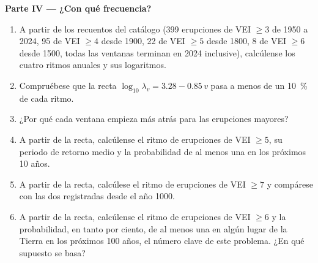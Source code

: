 \begin{problem}
\noindent\textbf{Parte IV --- ¿Con qué frecuencia?}
\begin{enumerate}[resume]
\item A partir de los recuentos del catálogo (399 erupciones de VEI $\ge 3$ de 1950 a
2024, 95 de VEI $\ge 4$ desde 1900, 22 de VEI $\ge 5$ desde 1800, 8 de VEI $\ge 6$ desde
1500, todas las ventanas terminan en 2024 inclusive), calcúlense los cuatro ritmos anuales y
sus logaritmos.
\item Compruébese que la recta $\log_{10}\lambda_v = 3.28 - 0.85\,v$ pasa a menos de un
\qty{10}{\percent} de cada ritmo.
\item ¿Por qué cada ventana empieza más atrás para las erupciones mayores?
\item A partir de la recta, calcúlense el ritmo de erupciones de VEI $\ge 5$, su periodo
de retorno medio y la probabilidad de al menos una en los próximos 10 años.
\item A partir de la recta, calcúlese el ritmo de erupciones de VEI $\ge 7$ y compárese
con las dos registradas desde el año 1000.
\item A partir de la recta, calcúlense el ritmo de erupciones de VEI $\ge 6$ y la
probabilidad, en tanto por ciento, de al menos una en algún lugar de la Tierra en los próximos 100
años, el número clave de este problema. ¿En qué supuesto se basa?
\end{enumerate}
\end{problem}
